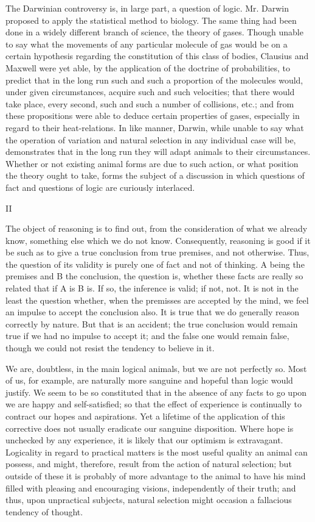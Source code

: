 \documentclass[]{article}
\newcommand{\itemsection}[1]{\bigskip\centerline{#1}\nopagebreak}
\begin{document}
The Darwinian controversy is, in large part, a question of logic. Mr. Darwin proposed to apply the statistical method to biology. The same thing had been done in a widely different branch of science, the theory of gases. Though unable to say what the movements of any particular molecule of gas would be on a certain hypothesis regarding the constitution of this class of bodies, Clausius and Maxwell were yet able, by the application of the doctrine of probabilities, to predict that in the long run such and such a proportion of the molecules would, under given circumstances, acquire such and such velocities; that there would take place, every second, such and such a number of collisions, etc.; and from these propositions were able to deduce certain properties of gases, especially in regard to their heat-relations. In like manner, Darwin, while unable to say what the operation of variation and natural selection in any individual case will be, demonstrates that in the long run they will adapt animals to their circumstances. Whether or not existing animal forms are due to such action, or what position the theory ought to take, forms the subject of a discussion in which questions of fact and questions of logic are curiously interlaced.

\itemsection{II}

The object of reasoning is to find out, from the consideration of what we already know, something else which we do not know. Consequently, reasoning is good if it be such as to give a true conclusion from true premises, and not otherwise. Thus, the question of its validity is purely one of fact and not of thinking. A being the premises and B the conclusion, the question is, whether these facts are really so related that if A is B is. If so, the inference is valid; if not, not. It is not in the least the question whether, when the premisses are accepted by the mind, we feel an impulse to accept the conclusion also. It is true that we do generally reason correctly by nature. But that is an accident; the true conclusion would remain true if we had no impulse to accept it; and the false one would remain false, though we could not resist the tendency to believe in it.

We are, doubtless, in the main logical animals, but we are not perfectly so. Most of us, for example, are naturally more sanguine and hopeful than logic would justify. We seem to be so constituted that in the absence of any facts to go upon we are happy and self-satisfied; so that the effect of experience is continually to contract our hopes and aspirations. Yet a lifetime of the application of this corrective does not usually eradicate our sanguine disposition. Where hope is unchecked by any experience, it is likely that our optimism is extravagant. Logicality in regard to practical matters is the most useful quality an animal can possess, and might, therefore, result from the action of natural selection; but outside of these it is probably of more advantage to the animal to have his mind filled with pleasing and encouraging visions, independently of their truth; and thus, upon unpractical subjects, natural selection might occasion a fallacious tendency of thought.
\end{document}
